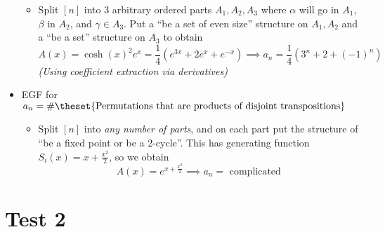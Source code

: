 \begin{itemize}
  \begin{itemize}
  \tightlist
  \item
    Split \([n]\) into 3 arbitrary ordered parts \(A_1, A_2, A_3\) where
    \(\alpha\) will go in \(A_1\), \(\beta\) in \(A_2\), and
    \(\gamma \in A_3\). Put a ``be a set of even size'' structure on
    \(A_1, A_2\) and a ``be a set'' structure on \(A_3\) to obtain \[
    A(x) = \cosh(x)^2 e^x = \frac{1}{4}(e^{3x} + 2e^x + e^{-x}) \implies a_n = \frac{1}{4}(3^n + 2 + (-1)^n)
    \] \emph{(Using coefficient extraction via derivatives)}
  \end{itemize}
\item
  EGF for
  \(a_n = \#\theset{\text{Permutations that are products of disjoint transpositions}}\)

  \begin{itemize}
  \tightlist
  \item
    Split \([n]\) into \emph{any number of parts}, and on each part put
    the structure of ``be a fixed point or be a 2-cycle''. This has
    generating function \(S_i(x) = x + \frac{x^2}{2}\), so we obtain \[
    A(x) = e^{x + \frac{x^2}{2}} \implies a_n = \text{ complicated}
    \]
  \end{itemize}
\end{itemize}

\hypertarget{test-2}{%
\section{Test 2}\label{test-2}}





